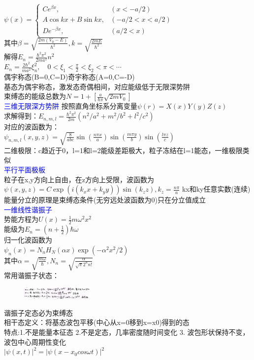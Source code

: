 \documentclass[a4paper,8pt]{extarticle} %
\newcommand{\bluetext}[1]{\textcolor{blue}{#1}}
\begin{document}
\begin{multicols}{3}
$\psi(x)=\begin{cases}
Ce^{\beta x}, & (x < -a/2) \\
A\cos kx + B\sin kx, & (-a/2 < x < a/2) \\
De^{-\beta x}, & (a/2 < x)
\end{cases}$\\
其中$\beta = \sqrt{\frac{2m(V_0-E)}{\hbar^2}},k = \sqrt{\frac{2mE}{\hbar^2}}$\\
解得$E_n = \frac{\hbar^2\pi^2}{2ma^2}n^2$\\
$E_n = \frac{2\hbar^2}{ma^2}\xi_n^2, \quad 0 < \xi_1 < \frac{\pi}{2} < \xi_2 < \pi < \cdots$\\
偶宇称态(B=0,C=D)奇宇称态(A=0,C=-D)\\基态为偶宇称态，激发态奇偶相间，对应能级低于无限深势阱
\\束缚态的能级总数为$N=1+[\frac{a}{\hbar\pi}\sqrt{2mV_0}]$\\
\bluetext{三维无限深方势阱}
按照直角坐标系分离变量$\psi(r) = X(x)Y(y)Z(z)$\\
求解得到：$E_{n,m,l} = \frac{\hbar^2\pi^2}{2m}(n^2/a^2 + m^2/b^2 + l^2/c^2)$\\
对应的波函数为：\\$\psi_{n,m,l}(x,y,z) = \sqrt{\frac{8}{abc}}\sin(\frac{n\pi x}{a})\sin(\frac{m\pi y}{b})\sin(\frac{l\pi z}{c})$\\
二维极限：c趋近于0，l=1和l=2能级差距极大，粒子冻结在l=1能态，一维极限类似\\
\bluetext{平行平面极板}\\
粒子在x,y方向上自由，在z方向上受限，波函数为\\
$\psi(x,y,z) = C\exp(i(k_xx+k_yy))\sin(k_zz),k_z=\frac{n\pi}{a}$ kx和ky任意实数(连续)\\
能量分立的原理是束缚态条件(无穷远处波函数为0)只在分立值成立\\
\bluetext{一维线性谐振子}\\
势能方程为$U(x) = \frac{1}{2}m\omega^2x^2$\\
能级为$E_n = (n+\frac{1}{2})\hbar\omega$\\
归一化波函数为\\$\psi_n(x) = N_nH_N(\alpha x)\exp(-\alpha^2x^2/2)$\\
其中$\alpha = \sqrt{\frac{m\omega}{\hbar}},N_n = \sqrt{\frac{\alpha}{\sqrt{\pi}2^n n!}}$\\
常用谐振子状态：\\
\begin{figure}[H]
    \vspace{-0.5cm}
    \centering
    \includegraphics[width=0.32\textwidth]{images/31.png}
    \vspace{-0.6cm}
\end{figure}
谐振子定态必为束缚态\\
相干态定义：将基态波包平移(中心从x=0移到x=x0)得到的态\\
特点:1.不是能量本征态 2.不是定态，几率密度随时间变化 3. 波包形状保持不变，波包中心周期性变化\\
$|\psi(x,t)|^2=|\psi(x-x_0 cos\omega t)|^2$


\end{multicols}
\end{document}
